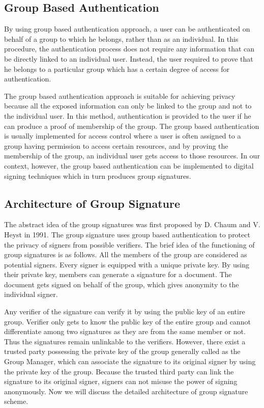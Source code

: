 \subsection{Group Based Authentication}
By using group based authentication approach, a user can be authenticated on behalf of a group to which he belongs, rather than as an individual. In this procedure, the authentication process does not require any information that can be directly linked to an individual user. Instead, the user required to prove that he belongs to a particular group which has a certain degree of access for authentication. 

The group based authentication approach is suitable for achieving privacy because all the exposed information can only be linked to the group and not to the individual user. In this method, authentication is provided to the user if he can produce a proof of membership of the group. The group based authentication is usually implemented for access control where a user is often assigned to a group having permission to access certain resources, and by proving the membership of the group, an individual user gets access to those resources. In our context, however, the group based authentication can be implemented to digital signing techniques which in turn produces group signatures.
\subsection{Architecture of Group Signature}
The abstract idea of the group signatures was first proposed by D. Chaum and V. Heyst in 1991\cite{chaum1991group}. The group signature uses group based authentication to protect the privacy of signers from possible verifiers. The brief idea of the functioning of group signatures is as follows. All the members of the group are considered as potential signers. Every signer is equipped with a unique private key. By using their private key, members can generate a signature for a document. The document gets signed on behalf of the group, which gives anonymity to the individual signer. 

Any verifier of the signature can verify it by using the public key of an entire group. Verifier only gets to know the public key of the entire group and cannot differentiate among two signatures as they are from the same member or not. Thus the signatures remain unlinkable to the verifiers. However, there exist a trusted party possessing the private key of the group generally called as the Group Manager, which can associate the signature to its original signer by using the private key of the group. Because the trusted third party can link the signature to its original signer, signers can not misuse the power of signing anonymously. Now we will discuss the detailed architecture of group signature scheme.

